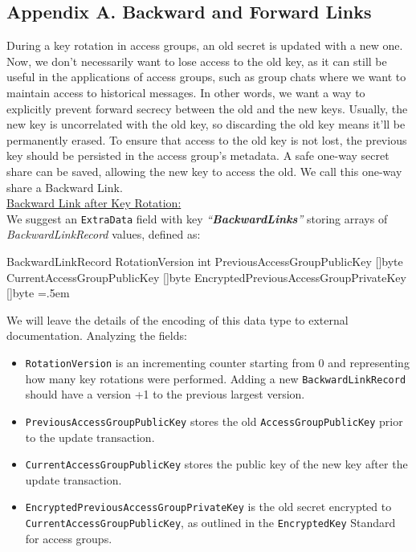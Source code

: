 \documentclass[oneside, 12pt]{article}
\newenvironment{lcverbatim}
 {\SaveVerbatim{cverb}}
 {\endSaveVerbatim
  \flushleft\fboxrule=0pt\fboxsep=.5em
  \colorbox{cverbbg}{%
    \makebox[\dimexpr\linewidth-2\fboxsep][l]{\BUseVerbatim{cverb}}%
  }
  \endflushleft
}
\begin{document}
\subsection{Appendix A. Backward and Forward Links}
During a key rotation in access groups, an old secret is updated with a new one. Now, we don’t necessarily want to lose access to the old key, as it can still be useful in the applications of access groups, such as group chats where we want to maintain access to historical messages. In other words, we want a way to explicitly prevent forward secrecy between the old and the new keys. Usually, the new key is uncorrelated with the old key, so discarding the old key means it’ll be permanently erased. To ensure that access to the old key is not lost, the previous key should be persisted in the access group’s metadata. A safe one-way secret share can be saved, allowing the new key to access the old. We call this one-way share a Backward Link.\\

\noindent\underline{Backward Link after Key Rotation:}\\
\noindent We suggest an \texttt{ExtraData} field with key \textit{“\textbf{BackwardLinks}”} storing arrays of \textit{BackwardLinkRecord} values, defined as:

\begin{lcverbatim}
BackwardLinkRecord
{
    RotationVersion                        int
    PreviousAccessGroupPublicKey           []byte
    CurrentAccessGroupPublicKey            []byte
    EncryptedPreviousAccessGroupPrivateKey []byte
}
\end{lcverbatim}

\noindent We will leave the details of the encoding of this data type to external documentation. Analyzing the fields:

\begin{itemize}
  \item \texttt{RotationVersion} is an incrementing counter starting from 0 and representing how many key rotations were performed. Adding a new \texttt{BackwardLinkRecord} should have a version +1 to the previous largest version.
  \item \texttt{PreviousAccessGroupPublicKey} stores the old \texttt{AccessGroupPublicKey} prior to the update transaction.
  \item \texttt{CurrentAccessGroupPublicKey} stores the public key of the new key after the update transaction.
  \item \texttt{EncryptedPreviousAccessGroupPrivateKey} is the old secret encrypted to \texttt{CurrentAccessGroupPublicKey}, as outlined in the \texttt{EncryptedKey} Standard for access groups.
\end{itemize}
\end{document}
